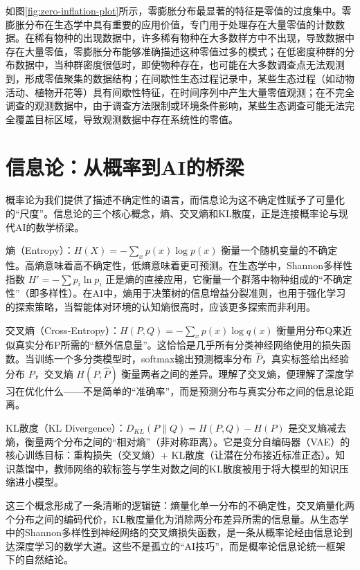 \documentclass[
  twoside,12pt,fontset=none]{ctexbook}
\begin{document}
如图\ref{fig:zero-inflation-plot}所示，零膨胀分布最显著的特征是零值的过度集中。零膨胀分布在生态学中具有重要的应用价值，专门用于处理存在大量零值的计数数据。在稀有物种的出现数据中，许多稀有物种在大多数样方中不出现，导致数据中存在大量零值，零膨胀分布能够准确描述这种零值过多的模式；在低密度种群的分布数据中，当种群密度很低时，即使物种存在，也可能在大多数调查点无法观测到，形成零值聚集的数据结构；在间歇性生态过程记录中，某些生态过程（如动物活动、植物开花等）具有间歇性特征，在时间序列中产生大量零值观测；在不完全调查的观测数据中，由于调查方法限制或环境条件影响，某些生态调查可能无法完全覆盖目标区域，导致观测数据中存在系统性的零值。

\hypertarget{ux4fe1ux606fux8bbaux4eceux6982ux7387ux5230aiux7684ux6865ux6881}{%
\section{信息论：从概率到AI的桥梁}\label{ux4fe1ux606fux8bbaux4eceux6982ux7387ux5230aiux7684ux6865ux6881}}

概率论为我们提供了描述不确定性的语言，而信息论为这不确定性赋予了可量化的``尺度''。信息论的三个核心概念，熵、交叉熵和KL散度，正是连接概率论与现代AI的数学桥梁。

熵（Entropy）：\(H(X) = -\sum_x p(x) \log p(x)\) 衡量一个随机变量的不确定性。高熵意味着高不确定性，低熵意味着更可预测。在生态学中，Shannon多样性指数 \(H' = -\sum p_i \ln p_i\) 正是熵的直接应用，它衡量一个群落中物种组成的``不确定性''（即多样性）。在AI中，熵用于决策树的信息增益分裂准则，也用于强化学习的探索策略，当智能体对环境的认知熵很高时，应该更多探索而非利用。

交叉熵（Cross-Entropy）：\(H(P,Q) = -\sum_x p(x) \log q(x)\) 衡量用分布Q来近似真实分布P所需的``额外信息量''。这恰恰是几乎所有分类神经网络使用的损失函数。当训练一个多分类模型时，softmax输出预测概率分布 \(\hat{P}\)，真实标签给出经验分布 \(P\)，交叉熵 \(H(P, \hat{P})\) 衡量两者之间的差异。理解了交叉熵，便理解了深度学习在优化什么------不是简单的``准确率''，而是预测分布与真实分布之间的信息论距离。

KL散度（KL Divergence）：\(D_{KL}(P\|Q) = H(P,Q) - H(P)\) 是交叉熵减去熵，衡量两个分布之间的``相对熵''（非对称距离）。它是变分自编码器（VAE）的核心训练目标：重构损失（交叉熵）+ KL散度（让潜在分布接近标准正态）。知识蒸馏中，教师网络的软标签与学生对数之间的KL散度被用于将大模型的知识压缩进小模型。

这三个概念形成了一条清晰的逻辑链：熵量化单一分布的不确定性，交叉熵量化两个分布之间的编码代价，KL散度量化为消除两分布差异所需的信息量。从生态学中的Shannon多样性到神经网络的交叉熵损失函数，是一条从概率论经由信息论到达深度学习的数学大道。这些不是孤立的``AI技巧''，而是概率论信息论统一框架下的自然结论。
\end{document}
